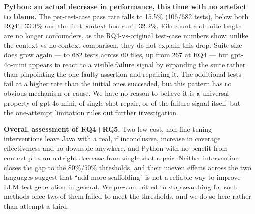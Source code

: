 \textbf{Python: an actual decrease in performance, this time with no artefact to blame.}
The per-test-case pass rate falls to 15.5\% (106/682 tests), below both RQ4's 33.3\% and
the first context-less run's 32.2\%. File count and suite length are no longer confounders,
as the RQ4-vs-original test-case numbers show; unlike the context-vs-no-context comparison,
they do not explain this drop. Suite size does grow again --- to 682 tests across 60 files,
up from 267 at RQ4 --- but gpt-4o-mini appears to react to a visible failure signal by
expanding the suite rather than pinpointing the one faulty assertion and repairing it. The
additional tests fail at a higher rate than the initial ones succeeded, but this pattern
has no obvious mechanism or cause. We have no reason to believe it is a universal property
of gpt-4o-mini, of single-shot repair, or of the failure signal itself, but the
one-attempt limitation rules out further investigation.

\textbf{Overall assessment of RQ4+RQ5.} Two low-cost, non-fine-tuning interventions leave
Java with a real, if inconclusive, increase in coverage effectiveness and no downside
anywhere, and Python with no benefit from context plus an outright decrease from
single-shot repair. Neither intervention closes the gap to the 80\%/60\% thresholds, and
their uneven effects across the two languages suggest that ``add more scaffolding'' is not
a reliable way to improve LLM test generation in general. We pre-committed to stop
searching for such methods once two of them failed to meet the thresholds, and we do so
here rather than attempt a third.
